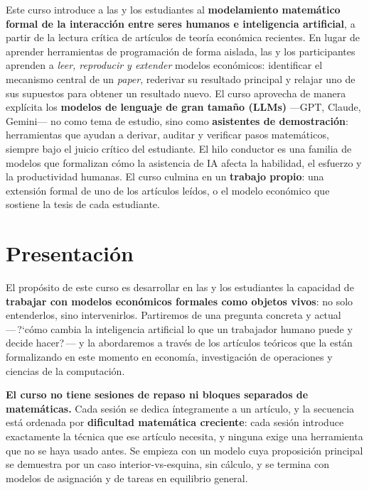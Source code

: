 \documentclass[11pt]{article}
\begin{document}
Este curso introduce a las y los estudiantes al \textbf{modelamiento matem\'atico formal de la interacci\'on entre seres humanos e inteligencia artificial}, a partir de la lectura cr\'itica de art\'iculos de teor\'ia econ\'omica recientes. En lugar de aprender herramientas de programaci\'on de forma aislada, las y los participantes aprenden a \emph{leer, reproducir y extender} modelos econ\'omicos: identificar el mecanismo central de un \emph{paper}, rederivar su resultado principal y relajar uno de sus supuestos para obtener un resultado nuevo. El curso aprovecha de manera expl\'icita los \textbf{modelos de lenguaje de gran tama\~no (LLMs)} ---GPT, Claude, Gemini--- no como tema de estudio, sino como \textbf{asistentes de demostraci\'on}: herramientas que ayudan a derivar, auditar y verificar pasos matem\'aticos, siempre bajo el juicio cr\'itico del estudiante. El hilo conductor es una familia de modelos que formalizan c\'omo la asistencia de IA afecta la habilidad, el esfuerzo y la productividad humanas. El curso culmina en un \textbf{trabajo propio}: una extensi\'on formal de uno de los art\'iculos le\'idos, o el modelo econ\'omico que sostiene la tesis de cada estudiante.

\section{Presentaci\'on}

El prop\'osito de este curso es desarrollar en las y los estudiantes la capacidad de \textbf{trabajar con modelos econ\'omicos formales como objetos vivos}: no solo entenderlos, sino intervenirlos. Partiremos de una pregunta concreta y actual ---\,?`c\'omo cambia la inteligencia artificial lo que un trabajador humano puede y decide hacer?\,--- y la abordaremos a trav\'es de los art\'iculos te\'oricos que la est\'an formalizando en este momento en econom\'ia, investigaci\'on de operaciones y ciencias de la computaci\'on.

\textbf{El curso no tiene sesiones de repaso ni bloques separados de matem\'aticas.} Cada sesi\'on se dedica \'integramente a un art\'iculo, y la secuencia est\'a ordenada por \textbf{dificultad matem\'atica creciente}: cada sesi\'on introduce exactamente la t\'ecnica que ese art\'iculo necesita, y ninguna exige una herramienta que no se haya usado antes. Se empieza con un modelo cuya proposici\'on principal se demuestra por un caso interior-vs-esquina, sin c\'alculo, y se termina con modelos de asignaci\'on y de tareas en equilibrio general.
\end{document}
